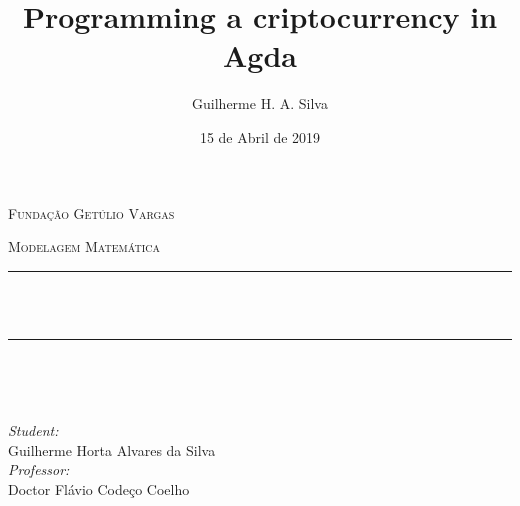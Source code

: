 \documentclass[12pt]{article}
\title{Programming a criptocurrency in Agda}
\author{Guilherme H. A. Silva}
\date{15 de Abril de 2019}
\makeatletter
\let\thetitle\@title
\makeatother
\begin{document}

\begin{titlepage}
	\centering
    \vspace*{0.5 cm}
   \begin{center}    \textsc{\Large   Fundação Getúlio Vargas}\\[2.0 cm]	\end{center}%
   \textsc{\Large Modelagem Matemática  }\\[0.5 cm]				%
	\rule{\linewidth}{0.2 mm} \\[0.4 cm]
	{ \huge \bfseries \thetitle}\\
	\rule{\linewidth}{0.2 mm} \\[1.5 cm]
	
	\begin{minipage}{0.4\textwidth}
		\begin{flushleft} \large
			\end{flushleft}
			\end{minipage}~
			\begin{minipage}{0.4\textwidth}
            
			\begin{flushright} \large
        \emph{Student:} \\
        Guilherme Horta Alvares da Silva \\
        \emph{Professor:} \\
        Doctor Flávio Codeço Coelho
		\end{flushright}
           
	\end{minipage}\\[2 cm]

    
	
\end{titlepage}


\tableofcontents
\pagebreak

\renewcommand{\thesection}{\arabic{section}}
\end{document}
